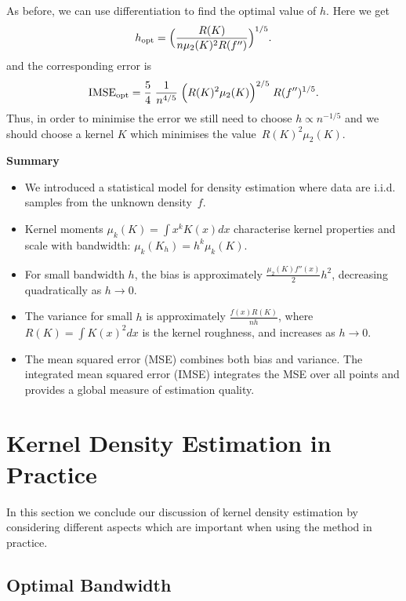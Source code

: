 \documentclass[
  a4paper,
]{article}
\providecommand{\tightlist}{%
  \setlength{\itemsep}{0pt}\setlength{\parskip}{0pt}}
\theoremstyle{definition}
\theoremstyle{definition}
\theoremstyle{definition}
\theoremstyle{definition}
\theoremstyle{remark}
\begin{document}
As before, we can use differentiation to find the optimal value of \(h\).
Here we get
\begin{equation*}
  h_\mathrm{opt}
  = \Bigl( \frac{R(K)}{n \mu_2(K)^2 R(f'')} \Bigr)^{1/5}.
\end{equation*}
and the corresponding error is
\begin{equation}
  \mathrm{IMSE}_\mathrm{opt}
  = \frac54 \; \frac{1}{n^{4/5}}
      \; \Bigl( R(K)^2 \mu_2(K) \Bigr)^{2/5}
      \; R(f'')^{1/5}.  \label{eq:IMSE-opt}
\end{equation}
Thus, in order to minimise the error we still need to choose
\(h \propto n^{-1/5}\) and we should choose a kernel \(K\) which minimises
the value~\(R(K)^2 \mu_2(K)\).

\textbf{Summary}

\begin{itemize}
\tightlist
\item
  We introduced a statistical model for density estimation where data are
  i.i.d. samples from the unknown density~\(f\).
\item
  Kernel moments \(\mu_k(K) = \int x^k K(x) dx\) characterise kernel properties
  and scale with bandwidth: \(\mu_k(K_h) = h^k \mu_k(K)\).
\item
  For small bandwidth \(h\), the bias is approximately
  \(\frac{\mu_2(K) f''(x)}{2} h^2\), decreasing quadratically as \(h \to 0\).
\item
  The variance for small \(h\) is approximately \(\frac{f(x) R(K)}{nh}\),
  where \(R(K) = \int K(x)^2 dx\) is the kernel roughness, and increases
  as \(h \to 0\).
\item
  The mean squared error (MSE) combines both bias and variance. The integrated
  mean squared error (IMSE) integrates the MSE over all points and provides a
  global measure of estimation quality.
\end{itemize}

\clearpage

\section{Kernel Density Estimation in Practice}\label{X03-practice}

In this section we conclude our discussion of kernel density estimation
by considering different aspects which are important when using the method
in practice.

\subsection{Optimal Bandwidth}\label{optimal-bandwidth}
\end{document}
